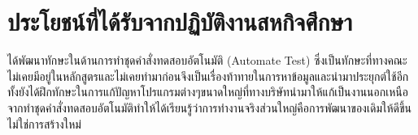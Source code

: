 \newpage
\section{ประโยชน์ที่ได้รับจากปฏิบัติงานสหกิจศึกษา}
ได้พัฒนาทักษะในด้านการทำชุดคำสั่งทดสอบอัตโนมัติ (Automate Test) ซึ่งเป็นทักษะที่ทางคณะไม่เคยมีอยู่ในหลักสูตรและไม่เคยทำมาก่อนจึงเป็นเรื่องท้าทายในการหาข้อมูลและนำมาประยุกต์ใช้อีกทั้งยังได้ฝึกทักษะในการแก้ปัญหาโปรแกรมต่างๆขนาดใหญ่ที่ทางบริษัทนำมาให้แก้เป็นงานนอกเหนือจากทำชุดคำสั่งทดสอบอัตโนมัติทำให้ได้เรียนรู้ว่าการทำงานจริงส่วนใหญ่คือการพัฒนาของเดิมให้ดีขึ้นไม่ใช่การสร้างใหม่